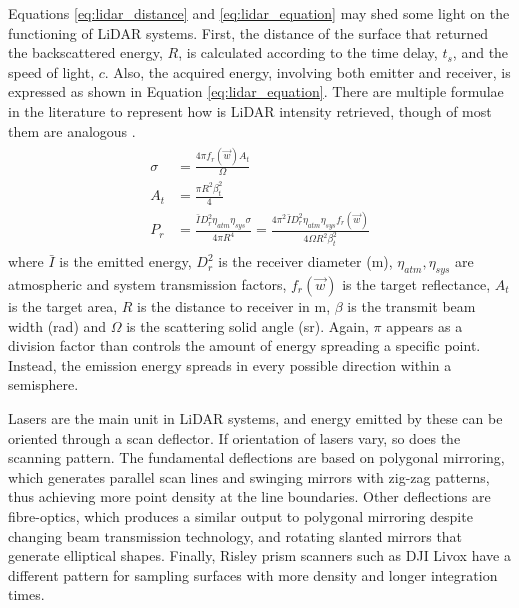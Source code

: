 Equations \ref{eq:lidar_distance} and \ref{eq:lidar_equation} may shed some light on the functioning of LiDAR systems. First, the distance of the surface that returned the backscattered energy, $R$, is calculated according to the time delay, $t_s$, and the speed of light, $c$. Also, the acquired energy, involving both emitter and receiver, is expressed as shown in Equation \ref{eq:lidar_equation}. There are multiple formulae in the literature to represent how is LiDAR intensity retrieved, though of most them are analogous \cite{hofle_correction_2007, bolkas_effect_2018, dong_lidar_2018}.
\begin{gather}
    \label{eq:lidar_equation}
    \begin{aligned}
        \sigma &= \frac{4\pi f_{r}(\vec{w})A_{t}}{\Omega}\\
        A_{t} &= \frac{\pi R^{2} \beta^{2}_{t}}{4}\\
        P_{r} &= \frac{\bar{I} D^{2}_{r} \eta_{atm} \eta_{sys} \sigma}{4 \pi R^{4}}=
        \frac{4\pi^2 \bar{I} D^{2}_{r} \eta_{atm} \eta_{sys}  f_{r}(\vec{w})}{4\Omega R^{2} \beta^{2}_{t}}
    \end{aligned}
\end{gather}
where $\bar{I}$ is the emitted energy, $D^{2}_{r}$ is the receiver diameter (\si{\meter}), $\eta_{atm}, \eta_{sys}$ are atmospheric and system transmission factors, $f_{r}(\vec{w})$ is the target reflectance, $A_{t}$ is the target area, $R$ is the distance to receiver in \si{\meter}, $\beta$ is the transmit beam width (\si{\radian}) and $\Omega$ is the scattering solid angle (\si{\steradian}). Again, $\pi$ appears as a division factor than controls the amount of energy spreading a specific point. Instead, the emission energy spreads in every possible direction within a semisphere.

Lasers are the main unit in LiDAR systems, and energy emitted by these can be oriented through a scan deflector. If orientation of lasers vary, so does the scanning pattern. The fundamental deflections are based on polygonal mirroring, which generates parallel scan lines and swinging mirrors with zig-zag patterns, thus achieving more point density at the line boundaries. Other deflections are fibre-optics, which produces a similar output to polygonal mirroring despite changing beam transmission technology, and rotating slanted mirrors that generate elliptical shapes. Finally, Risley prism scanners such as DJI Livox have a different pattern for sampling surfaces with more density and longer integration times.

